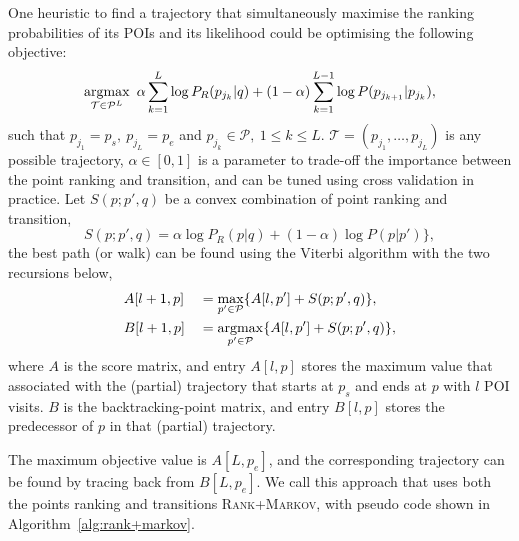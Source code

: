 One heuristic to find a trajectory that simultaneously maximise the ranking probabilities of its POIs and its likelihood 
could be optimising the following objective:
\begin{equation*}
    \operatorname*{argmax}_{\mathcal{T} \in \mathcal{P}^L} ~\alpha \sum_{k=1}^{L} \log P_R(p_{j_k} | q) +
                                     (1-\alpha) \sum_{k=1}^{L-1} \log P(p_{j_{k+1}} | p_{j_k}),
\end{equation*}
such that
$p_{j_1} = p_s, ~ p_{j_L} = p_e$ and
$p_{j_k} \in \mathcal{P}, ~1 \le k \le L$.
$\mathcal{T} = (p_{j_1}, \dots, p_{j_L})$ is any possible trajectory,
$\alpha \in [0, 1]$ is a parameter to trade-off the importance between the point ranking and transition, 
and can be tuned using cross validation in practice.
Let $S(p; p', q)$ be a convex combination of point ranking and transition,
\begin{equation*}
    S(p; p', q)  = \alpha \log P_R(p|q) + (1-\alpha) \log P(p|p') \},
\end{equation*}
the best path (or walk) can be found using the Viterbi algorithm with the two recursions below,
\begin{alignat}{2}
&A[l+1, p]   &&= \max_{p' \in \mathcal{P}} \{ A[l, p'] + S(p; p', q) \}, \label{eq:max} \\
&B[l+1, p]   &&= \operatorname*{argmax}_{p' \in \mathcal{P}} \{ A[l, p'] + S(p; p', q) \}, \label{eq:argmax}
\end{alignat}
where $A$ is the score matrix, and entry $A[l, p]$ stores the maximum value that associated with the (partial) trajectory
that starts at $p_s$ and ends at $p$ with $l$ POI visits.
$B$ is the backtracking-point matrix, and entry $B[l, p]$ stores the predecessor of $p$ in that (partial) trajectory.

The maximum objective value is $A[L, p_e]$,
and the corresponding trajectory can be found by tracing back from $B[L, p_e]$.
We call this approach that uses both the points ranking and transitions \textsc{Rank+Markov},
with pseudo code shown in Algorithm~\ref{alg:rank+markov}.


